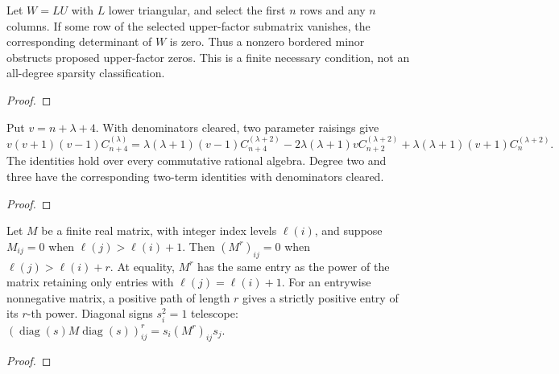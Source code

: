 \begin{supporting}
\begin{theorem}
\label{thm:elimination-minor-obstruction}
\leanok
Let $W=LU$ with $L$ lower triangular, and select the first $n$ rows and any
$n$ columns. If some row of the selected upper-factor submatrix vanishes,
the corresponding determinant of $W$ is zero. Thus a nonzero bordered minor
obstructs proposed upper-factor zeros. This is a finite necessary condition,
not an all-degree sparsity classification.
\end{theorem}
\begin{proof}
\leanok
\end{proof}

\begin{theorem}
\label{thm:gegenbauer-double-conversion}
\leanok
Put $v=n+\lambda+4$. With denominators cleared, two parameter raisings give
\[
 v(v+1)(v-1)C_{n+4}^{(\lambda)}
 =\lambda(\lambda+1)(v-1)C_{n+4}^{(\lambda+2)}
 -2\lambda(\lambda+1)v C_{n+2}^{(\lambda+2)}
 +\lambda(\lambda+1)(v+1)C_n^{(\lambda+2)}.
\]
The identities hold over every commutative rational algebra. Degree two and
three have the corresponding two-term identities with denominators cleared.
\end{theorem}
\begin{proof}
\leanok
\end{proof}

\begin{theorem}
\label{thm:maximal-level-paths}
\leanok
Let $M$ be a finite real matrix, with integer index levels $\ell(i)$, and suppose
$M_{ij}=0$ when $\ell(j)>\ell(i)+1$. Then $(M^r)_{ij}=0$ when
$\ell(j)>\ell(i)+r$. At equality, $M^r$ has the same entry as the power of
the matrix retaining only entries with $\ell(j)=\ell(i)+1$.
For an entrywise nonnegative matrix, a positive path of length $r$ gives a
strictly positive entry of its $r$-th power. Diagonal signs $s_i^2=1$ telescope:
$(\operatorname{diag}(s)M\operatorname{diag}(s))^r_{ij}=s_i(M^r)_{ij}s_j$.
\end{theorem}
\begin{proof}
\leanok
\end{proof}


\end{supporting}
